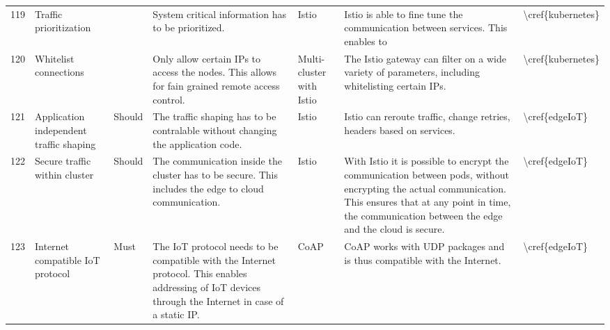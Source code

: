 \begin{table}[]
\begin{tabular}{lllllll}
119 & Traffic prioritization                  &                & System critical information has to be prioritized.                                                                                                                                         & Istio                    & Istio is able to fine tune the communication between services. This enables to                                                                                                                                                 & \textbackslash{}cref\{kubernetes\} \\
120 & Whitelist connections                   &                & Only allow certain IPs to access the nodes. This allows for fain grained remote access control.                                                                                            & Multi-cluster with Istio & The Istio gateway can filter on a wide variety of parameters, including whitelisting certain IPs.                                                                                                                              & \textbackslash{}cref\{kubernetes\} \\
121 & Application independent traffic shaping & Should         & The traffic shaping has to be contralable without changing the application code.                                                                                                           & Istio                    & Istio can reroute traffic, change retries, headers based on services.                                                                                                                                                          & \textbackslash{}cref\{edgeIoT\}    \\
122 & Secure traffic within cluster           & Should         & The communication inside the cluster has to be secure. This includes the edge to cloud communication.                                                                                      & Istio                    & With Istio it is possible to encrypt the communication between pods, without encrypting the actual communication. This ensures that at any point in time, the communication between the edge and the cloud is secure.          & \textbackslash{}cref\{edgeIoT\}    \\
123 & Internet compatible IoT protocol        & Must           & The IoT protocol needs to be compatible with the Internet protocol. This enables addressing of IoT devices through the Internet in case of a static IP.                                    & CoAP                     & CoAP works with UDP packages and is thus compatible with the Internet.                                                                                                                                                         & \textbackslash{}cref\{edgeIoT\}    \\

\end{tabular}
\end{table}
